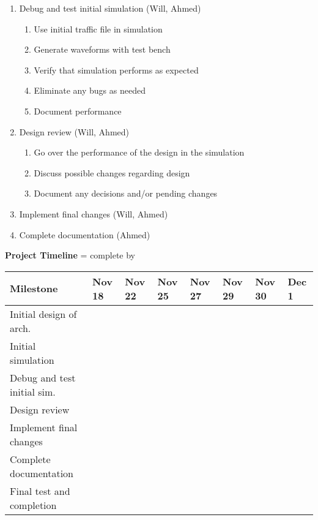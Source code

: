 \documentclass[12pt]{article}
\begin{document}
\begin{description}
\begin{enumerate}
			\item Debug and test initial simulation (Will, Ahmed)
			\begin{enumerate}
				\item Use initial traffic file in simulation
				\item Generate waveforms with test bench
				\item Verify that simulation performs as expected
				\item Eliminate any bugs as needed
				\item Document performance
			\end{enumerate}
			\item Design review (Will, Ahmed)
			\begin{enumerate}
				\item Go over the performance of the design in the simulation
				\item Discuss possible changes regarding design
				\item Document any decisions and/or pending changes
			\end{enumerate}
			\item Implement final changes (Will, Ahmed)
			\item Complete documentation (Ahmed)
		\end{enumerate}
		\textbf{Project Timeline}
		\checkmark = complete by
		\tabcolsep=0.11cm
		\begin{table}[h!]
 			\begin{tabulary}{1.3\textwidth}{|L|L|L|L|L|L|L|L|}
 			\hline
 			 Milestone & Nov 18 & Nov 22  & Nov 25 & Nov 27 & Nov 29 & Nov 30 & Dec 1\\ %
 			\hline
 			Initial design of arch. & \checkmark &  &  & & & &\\ 
			\hline
			Initial simulation &  & \checkmark &  &  & & &\\ 
			\hline
			Debug and test initial sim. &  &  & \checkmark &  & & &\\ 
			\hline
			Design review &  &  &  & \checkmark & & &\\ 
			\hline
			Implement final changes &  &  &  & & \checkmark & &\\ 
			\hline
			Complete documentation &  &  &  &  & & \checkmark &\\
			\hline
			Final test and completion &  &  &  &  & & & \checkmark \\
			\hline
 			\end{tabulary}
			\end{table}
			
\end{description}
\end{document}
